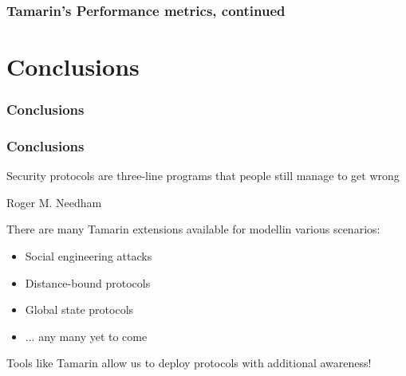 \documentclass[aspectratio=169,t,xcolor=table]{beamer}
\begin{document}
\begin{frame}[fragile]
    \frametitle{Tamarin's Performance metrics, continued}
    \begin{table}[]
        \centering
        \renewcommand{\arraystretch}{1.5}
        \setlength{\tabcolsep}{10pt}
        \caption{Tamarin's performances during the verification of the Needham Schoroeder Symmetric protocol after fixing}
    \end{table}
\end{frame}

\section{Conclusions}
\begin{frame}{}
    \frametitle{Conclusions}
\end{frame}


\begin{frame}
    \frametitle{Conclusions}
    \epigraph{Security protocols are three-line programs that people still manage to get wrong}{Roger M. Needham}

    There are many Tamarin extensions available for modellin various scenarios:
    \begin{itemize}
        \item Social engineering attacks
        \item Distance-bound protocols
        \item Global state protocols
        \item ... any many yet to come
    \end{itemize}

    Tools like Tamarin allow us to deploy protocols with additional awareness!
\end{frame}


\titlepage
\end{document}
